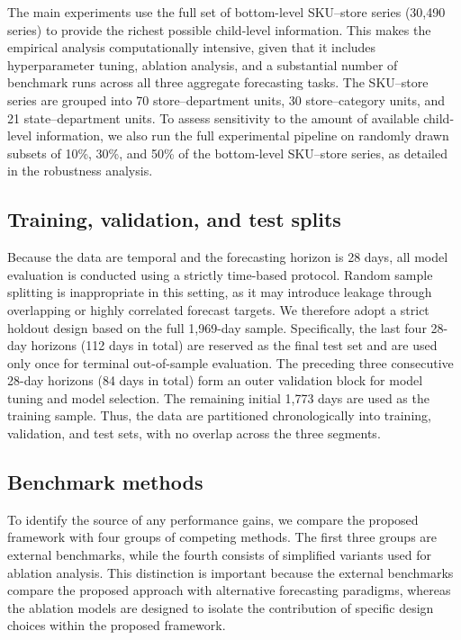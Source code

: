 \documentclass[12pt]{article}
\begin{document}
The main experiments use the full set of bottom-level SKU--store series (30,490 series) to provide the richest possible child-level information. This makes the empirical analysis computationally intensive, given that it includes hyperparameter tuning, ablation analysis, and a substantial number of benchmark runs across all three aggregate forecasting tasks. The SKU--store series are grouped into 70 store--department units, 30 store--category units, and 21 state--department units. To assess sensitivity to the amount of available child-level information, we also run the full experimental pipeline on randomly drawn subsets of 10\%, 30\%, and 50\% of the bottom-level SKU--store series, as detailed in the robustness analysis.

\subsection{Training, validation, and test splits}

Because the data are temporal and the forecasting horizon is 28 days, all model evaluation is conducted using a strictly time-based protocol. Random sample splitting is inappropriate in this setting, as it may introduce leakage through overlapping or highly correlated forecast targets. We therefore adopt a strict holdout design based on the full 1,969-day sample. Specifically, the last four 28-day horizons (112 days in total) are reserved as the final test set and are used only once for terminal out-of-sample evaluation. The preceding three consecutive 28-day horizons (84 days in total) form an outer validation block for model tuning and model selection. The remaining initial 1,773 days are used as the training sample. Thus, the data are partitioned chronologically into training, validation, and test sets, with no overlap across the three segments.

\subsection{Benchmark methods}

To identify the source of any performance gains, we compare the proposed framework with four groups of competing methods. The first three groups are external benchmarks, while the fourth consists of simplified variants used for ablation analysis. This distinction is important because the external benchmarks compare the proposed approach with alternative forecasting paradigms, whereas the ablation models are designed to isolate the contribution of specific design choices within the proposed framework.
\end{document}
